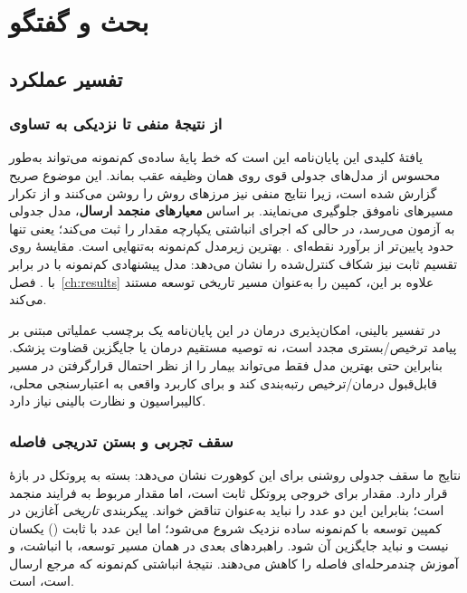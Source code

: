 \chapter{بحث و گفتگو}
\label{ch:discussion}

\section{تفسیر عملکرد}

\subsection{از نتیجۀ منفی تا نزدیکی به تساوی}

یافتۀ کلیدی این پایان‌نامه این است که خط پایۀ ساده‌ی کم‌نمونه می‌تواند به‌طور محسوس از مدل‌های جدولی قوی روی همان وظیفه عقب بماند. این موضوع صریح گزارش شده است، زیرا نتایج منفی نیز مرزهای روش را روشن می‌کنند و از تکرار مسیرهای ناموفق جلوگیری می‌نمایند. بر اساس \textbf{معیارهای منجمد ارسال}، مدل جدولی  به  آزمون \textbf{} می‌رسد، در حالی که اجرای انباشتی یکپارچه مقدار \textbf{} \cnum{[0.699, 0.797]} را ثبت می‌کند؛ یعنی تنها حدود \textbf{} پایین‌تر از برآورد نقطه‌ای . بهترین زیرمدل کم‌نمونه به‌تنهایی \textbf{} است. مقایسۀ  روی تقسیم ثابت نیز شکاف کنترل‌شده را نشان می‌دهد: مدل پیشنهادی کم‌نمونه با \textbf{} در برابر  با \textbf{}. فصل~\ref{ch:results} علاوه بر این، کمپین  را به‌عنوان مسیر تاریخی توسعه مستند می‌کند.

در تفسیر بالینی، امکان‌پذیری درمان در این پایان‌نامه یک برچسب عملیاتی مبتنی بر پیامد ترخیص/بستری مجدد است، نه توصیه مستقیم درمان یا جایگزین قضاوت پزشک. بنابراین حتی بهترین مدل فقط می‌تواند بیمار را از نظر احتمال قرارگرفتن در مسیر قابل‌قبول درمان/ترخیص رتبه‌بندی کند و برای کاربرد واقعی به اعتبارسنجی محلی، کالیبراسیون و نظارت بالینی نیاز دارد.

\subsection{سقف تجربی و بستن تدریجی فاصله}

نتایج ما سقف جدولی روشنی برای این کوهورت نشان می‌دهد: \textbf{} بسته به پروتکل در بازۀ \textbf{} قرار دارد. مقدار  برای  خروجی پروتکل ثابت  است، اما مقدار  مربوط به فرایند منجمد  است؛ بنابراین این دو عدد را نباید به‌عنوان تناقض خواند. پیکربندی \emph{تاریخی} آغازین در کمپین توسعه با کم‌نمونه ساده نزدیک \textbf{} شروع می‌شود؛ اما این عدد با  ثابت () یکسان نیست و نباید جایگزین آن شود. راهبردهای بعدی در همان مسیر توسعه، با انباشت،  و آموزش چندمرحله‌ای فاصله را کاهش می‌دهند. نتیجۀ انباشتی کم‌نمونه که مرجع ارسال است، \textbf{} است.

